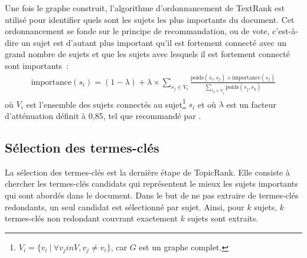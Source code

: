     Une fois le graphe construit, l'algorithme d'ordonnancement de TextRank est
    utilisé pour identifier quels sont les sujets les plus importants du
    document. Cet ordonnancement se fonde sur le principe de recommandation,
    ou de vote, c'est-à-dire un sujet est d'autant plus important qu'il est
    fortement connecté avec un grand nombre de sujets et que les sujets avec
    lesquels il est fortement connecté sont importants~:
    \begin{align}
      \text{importance}(s_i) = (1 - \lambda) + \lambda \times \sum_{s_j \in V_i} \frac{\text{poids}(s_i, s_j) \times \text{importance}(s_j)}{\sum_{s_k \in V_j} \text{poids}(s_j, s_k)} \label{math:textrank}
    \end{align}
    où $V_i$ est l'ensemble des sujets connectés au
    sujet\footnote{$V_i = \{v_i\ |\ \forall{v_j in V}, v_j \neq v_i\}$, car $G$
    est un graphe complet.} $s_i$ et où $\lambda$ est un facteur d'atténuation
    définit à 0,85, tel que recommandé par .

  \subsection{Sélection des termes-clés}
  \label{subsec:selection_des_termes_cles}
    La sélection des termes-clés est la dernière étape de TopicRank. Elle
    consiste à chercher les termes-clés candidats qui représentent le mieux les
    sujets importants qui sont abordés dans le document. Dans le but de ne pas
    extraire de termes-clés redondants, un seul candidat est sélectionné par
    sujet.
    Ainsi, pour $k$ sujets, $k$ termes-clés non redondant couvrant exactement
    $k$ sujets sont extraits.


